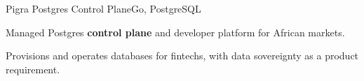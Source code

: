 \begin{cvproject}{Pigra Postgres Control Plane}{Go, PostgreSQL}
  \item Managed Postgres \textbf{control plane} and developer platform for African markets.
  \item Provisions and operates databases for fintechs, with data sovereignty as a product requirement.
\end{cvproject}
